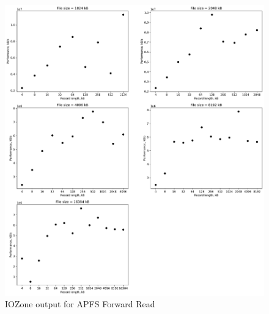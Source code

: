 \begin{figure}[!htb]
	\label{fig:app_beapfs_ffs_read}
	\begin{center}
		\includegraphics[width=1.0\textwidth]{figures/benchmarking/local/Read.pdf}
	\end{center}
	\caption{IOZone output for \gls{APFS} Forward Read}
\end{figure}

